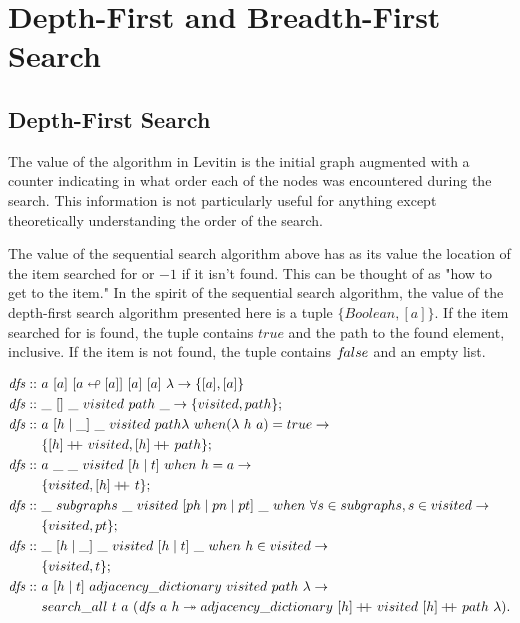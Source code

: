 \documentclass[a4paper,10pt]{book}
\newcommand\doubleplus{+\kern-1.3ex+\kern0.8ex}
\newcommand{\false}{f\kern-0.25ex{alse}}
\begin{document}
\section{Depth-First and Breadth-First Search}
\subsection{Depth-First Search}
The value of the algorithm in Levitin is the initial graph augmented with a counter indicating in what order each of the nodes was encountered during the search. This information is not particularly useful for anything except theoretically understanding the order of the search.

The value of the sequential search algorithm above has as its value the location of the item searched for or $-1$ if it isn't found. This can be thought of as "how to get to the item." In the spirit of the sequential search algorithm, the value of the depth-first search algorithm presented here is a tuple $\{Boolean,[a]\}$. If the item searched for is found, the tuple contains $true$ and the path to the found element, inclusive. If the item is not found, the tuple contains $\false$ and an empty list.

\begin{align*}
\text{\textit{dfs}}::\ &a\ [a]\ [a\looparrowleft [a]]\ [a]\ [a]\ \lambda\rightarrow \{[a],[a]\}\\
\text{\textit{dfs}}::\ &\_\ []\ \_\ visited\ path\ \_\rightarrow\{visited,path\};\\
\text{\textit{dfs}}::\ &a\ [h\mid \_]\ \_\ visited\ path \lambda\ when (\lambda\ h\ a)=true\rightarrow\\
	&\{[h]\doubleplus visited,[h]\doubleplus path\};\\
\text{\textit{dfs}}::\ &a\ \_\ \_\ visited\ [h\mid t]\ when\ h = a\rightarrow\\
	&\{visited,[h]\doubleplus t\};\\
\text{\textit{dfs}}::\ &\_\ subgraphs\ \_\ visited\ [ph\mid pn\mid pt]\ \_\ when\ \forall s\in subgraphs, s\in visited\rightarrow\\
	&\{visited,pt\};\\
\text{\textit{dfs}}::\ &\_\ [h\mid\_ ]\ \_\ visited\ [h\mid t]\ \_\ when\ h\in visited\rightarrow\\
	&\{visited,t\};\\
\text{\textit{dfs}}::\ &a\ [h\mid t]\ adjacency\_dictionary\ visited\ path\ \lambda\rightarrow\\
	&search\_all\ t\ a\ (\text{\textit{dfs}}\ a\ h\twoheadrightarrow adjacency\_dictionary\ [h]\doubleplus visited\ [h]\doubleplus path\ \lambda).
\end{align*}
\end{document}
